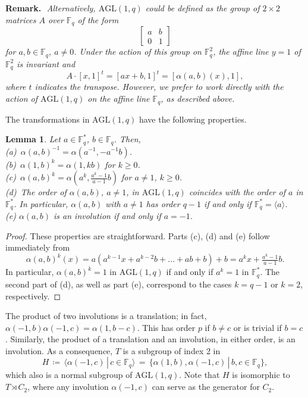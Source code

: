 \documentclass[12pt]{article}
\newtheorem{lemma}[theorem]{Lemma}
\theoremstyle{definition}\newtheorem{definition}{Definition}[section]
\begin{document}
\noindent
{\bf Remark.}\,\
{\em Alternatively, $\mathrm{AGL}(1,q)$ could be defined as the group of $2\times 2$ matrices $A$ over $\mathbb{F}_q$ of the form
\[ \left[\begin{matrix}
a&b\\
0&1
\end{matrix} \right]\]
for $a,b\in\mathbb{F}_q$, $a\neq 0$. Under the action of this group on $\mathbb{F}_q^2$, the affine line $y=1$ of $\mathbb{F}_q^2$ is invariant and 
\[A\cdot [x,1]^t = [ax+b,1]^t = [\alpha(a,b)(x),1],\]
where $t$ indicates the transpose. However, we prefer to work directly with the action of $\mathrm{AGL}(1,q)$ on the affine line $\mathbb{F}_q$, as described above.}
\medskip

The transformations in $\mathrm{AGL}(1,q)$ have the following properties.

\begin{lemma}
\label{aglprops}
Let $a\in\mathbb{F}_q^*$, $b\in\mathbb{F}_q$. Then,\\[.03in]
(a)\ $\alpha(a,b)^{-1} = \alpha(a^{-1},-a^{-1}b)$.\\[.03in]
(b)\ $\alpha(1,b)^k = \alpha(1,kb)$ for $k\geq 0$.\\[.03in]
(c)\ $\alpha(a,b)^k = \alpha(a^k, \frac{a^k-1}{a-1}b)$ for $a\neq 1$, $k\geq 0$.\\[.03in]
(d)\ The order of $\alpha(a,b)$, $a\neq 1$, in $\mathrm{AGL}(1,q)$ coincides with the order of $a$ in $\mathbb{F}_q^*$. In particular, $\alpha(a,b)$ with $a\neq 1$ has order $q-1$ if and only if $\mathbb{F}_q^*=\langle a\rangle$.\\[.03in]
(e) $\alpha(a,b)$ is an involution if and only if $a=-1$.
\end{lemma}

\begin{proof}
These properties are straightforward. Parts (c), (d) and (e) follow immediately from 
\[\alpha(a,b)^k(x) = a(a^{k-1}x+a^{k-2}b+\ldots+ab +b) +b = a^{k}x+ \tfrac{a^k-1}{a-1}b.\]
In particular, $\alpha(a,b)^k = 1$ in $\mathrm{AGL}(1,q)$ if and only if $a^k=1$ in $\mathbb{F}_q^*$. The second part of (d), as well as part (e), correspond to the cases $k=q-1$ or $k=2$, respectively.
\end{proof}
\smallskip

The product of two involutions is a translation; in fact, 
$\alpha(-1,b)\alpha(-1,c)=\alpha(1,b-c)$. This has order $p$ if $b\neq c$ or is trivial if $b=c$. Similarly, 
the product of a translation and an involution, in either order, is an involution. As a consequence, $T$ is a subgroup of index 2 in 
\begin{equation}
\label{invgen}
H\,\coloneqq \,\langle \alpha(-1,c)\,|\, c\in \mathbb{F}_q\rangle
\,=\,\{\alpha(1,b),\alpha(-1,c)\,|\, b,c\in \mathbb{F}_q\} ,
\end{equation}
which also is a normal subgroup of $\mathrm{AGL}(1,q)$. Note that $H$ is isomorphic to $T\rtimes C_2$, where any involution $\alpha(-1,c)$ can serve as the generator for $C_2$. 
\medskip
\end{document}
